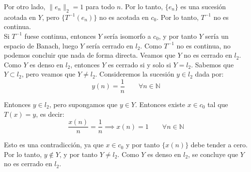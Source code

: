 \documentclass[12pt]{article}
\begin{document}
\begin{ejercicio}[2 puntos]
\begin{enumerate}[label=\alph*)]
            Por otro lado, $\|e_n\|_2 = 1$ para todo $n$. Por lo tanto, $\{e_n\}$ es una sucesión acotada en $Y$, pero $\{T^{-1}(e_n)\}$ no es acotada en $c_0$. Por lo tanto, $T^{-1}$ no es continua.\\

            
            Si $T^{-1}$ fuese continua, entonces $Y$ sería isomorfo a $c_0$, y por tanto $Y$ sería un espacio de Banach, luego $Y$ sería cerrado en $l_2$. Como $T^{-1}$ no es continua, no podemos concluir que nada de forma directa. Veamos que $Y$ no es cerrado en $l_2$. Como $Y$ es denso en $l_2$, entonces $Y$ es cerrado si y solo si $Y = l_2$. Sabemos que $Y\subset l_2$, pero veamos que $Y\neq l_2$. Consideremos la sucesión $y\in l_2$ dada por:
            \begin{equation*}
                y(n) = \frac{1}{n} \qquad \forall n\in \mathbb{N}
            \end{equation*}

            Entonces $y\in l_2$, pero supongamos que $y\in Y$. Entonces existe $x\in c_0$ tal que $T(x) = y$, es decir:
            \begin{equation*}
                \frac{x(n)}{n} = \frac{1}{n} \implies x(n) = 1 \qquad \forall n\in \mathbb{N}
            \end{equation*}

            Esto es una contradicción, ya que $x\in c_0$ y por tanto $\{x(n)\}$ debe tender a cero. Por lo tanto, $y\notin Y$, y por tanto $Y\neq l_2$. Como $Y$ es denso en $l_2$, se concluye que $Y$ no es cerrado en $l_2$.
        \end{enumerate}
    \end{ejercicio}
\end{document}
